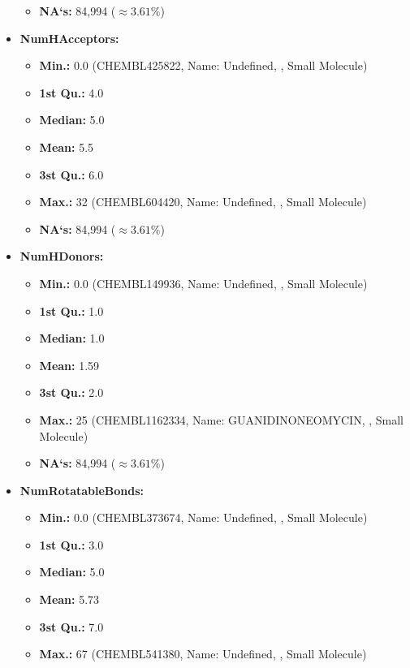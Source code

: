 \documentclass[10pt]{article}
\begin{document}
\begin{itemize}
\begin{itemize}
        \item \textbf{NA`s:} 84,994 ($\approx 3.61\% $)
    \end{itemize}
    \item \textbf{NumHAcceptors:}
    \begin{itemize}
        \item \textbf{Min.:} 0.0 (CHEMBL425822, Name: Undefined,  , Small Molecule)
        \item \textbf{1st Qu.:} 4.0
        \item \textbf{Median:} 5.0
        \item \textbf{Mean:} 5.5
        \item \textbf{3st Qu.:} 6.0
        \item \textbf{Max.:} 32 (CHEMBL604420, Name: Undefined, , Small Molecule)
        \item \textbf{NA`s:} 84,994 ($\approx 3.61\% $)
    \end{itemize}
    \item \textbf{NumHDonors:}
    \begin{itemize}
        \item \textbf{Min.:} 0.0 (CHEMBL149936, Name: Undefined,  , Small Molecule)
        \item \textbf{1st Qu.:} 1.0
        \item \textbf{Median:} 1.0
        \item \textbf{Mean:} 1.59
        \item \textbf{3st Qu.:} 2.0
        \item \textbf{Max.:} 25 (CHEMBL1162334, Name: GUANIDINONEOMYCIN, , Small Molecule)
        \item \textbf{NA`s:} 84,994 ($\approx 3.61\% $)
    \end{itemize}
    \item \textbf{NumRotatableBonds:}
    \begin{itemize}
        \item \textbf{Min.:} 0.0 (CHEMBL373674, Name: Undefined,  , Small Molecule)
        \item \textbf{1st Qu.:} 3.0
        \item \textbf{Median:} 5.0
        \item \textbf{Mean:} 5.73
        \item \textbf{3st Qu.:} 7.0
        \item \textbf{Max.:} 67 (CHEMBL541380, Name: Undefined, , Small Molecule)

\end{itemize}
\end{itemize}
\end{document}

